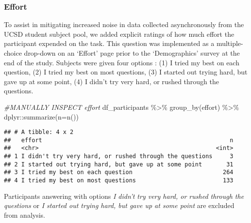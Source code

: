 \documentclass[
]{article}
\newenvironment{Shaded}{\begin{snugshade}}{\end{snugshade}}
\newcommand{\AttributeTok}[1]{\textcolor[rgb]{0.77,0.63,0.00}{#1}}
\newcommand{\CommentTok}[1]{\textcolor[rgb]{0.56,0.35,0.01}{\textit{#1}}}
\newcommand{\FunctionTok}[1]{\textcolor[rgb]{0.00,0.00,0.00}{#1}}
\newcommand{\NormalTok}[1]{#1}
\newcommand{\SpecialCharTok}[1]{\textcolor[rgb]{0.00,0.00,0.00}{#1}}
\begin{document}
\hypertarget{effort}{%
\subsubsection{Effort}\label{effort}}

To assist in mitigating increased noise in data collected asynchronously
from the UCSD student subject pool, we added explicit ratings of how
much effort the participant expended on the task. This question was
implemented as a multiple-choice drop-down on an `Effort' page prior to
the `Demographics' survey at the end of the study. Subjects were given
four options : (1) I tried my best on each question, (2) I tried my best
on most questions, (3) I started out trying hard, but gave up at some
point, (4) I didn't try very hard, or rushed through the questions.

\begin{Shaded}
\begin{Highlighting}[]
\CommentTok{\#MANUALLY INSPECT effort}
\NormalTok{df\_participants }\SpecialCharTok{\%\textgreater{}\%} \FunctionTok{group\_by}\NormalTok{(effort) }\SpecialCharTok{\%\textgreater{}\%} 
\NormalTok{  dplyr}\SpecialCharTok{::}\FunctionTok{summarize}\NormalTok{(}\AttributeTok{n=}\FunctionTok{n}\NormalTok{())}
\end{Highlighting}
\end{Shaded}

\begin{verbatim}
## # A tibble: 4 x 2
##   effort                                                      n
##   <chr>                                                   <int>
## 1 I didn't try very hard, or rushed through the questions     3
## 2 I started out trying hard, but gave up at some point       31
## 3 I tried my best on each question                          264
## 4 I tried my best on most questions                         133
\end{verbatim}

Participants answering with options \emph{I didn't try very hard, or
rushed through the questions} or \emph{I started out trying hard, but
gave up at some point} are excluded from analysis.
\end{document}
